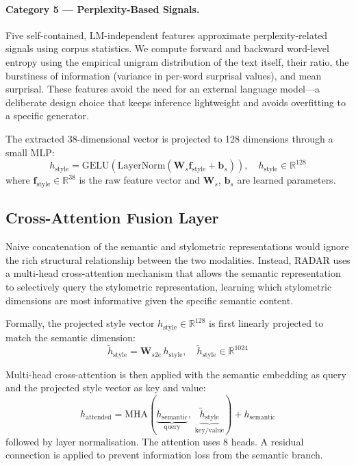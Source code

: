 \paragraph{Category 5 — Perplexity-Based Signals.} Five self-contained, LM-independent
features approximate perplexity-related signals using corpus statistics. We compute forward and
backward word-level entropy using the empirical unigram distribution of the text itself, their
ratio, the burstiness of information (variance in per-word surprisal values), and mean surprisal.
These features avoid the need for an external language model—a deliberate design choice that keeps
inference lightweight and avoids overfitting to a specific generator.

The extracted 38-dimensional vector is projected to 128 dimensions through a small MLP:
\begin{equation}
  h_\text{style} = \mathrm{GELU}(\mathrm{LayerNorm}(\mathbf{W}_s \mathbf{f}_\text{style} + \mathbf{b}_s)),
  \quad h_\text{style} \in \mathbb{R}^{128}
\end{equation}
where $\mathbf{f}_\text{style} \in \mathbb{R}^{38}$ is the raw feature vector and $\mathbf{W}_s$,
$\mathbf{b}_s$ are learned parameters.

\subsection{Cross-Attention Fusion Layer}

Naive concatenation of the semantic and stylometric representations would ignore the rich structural
relationship between the two modalities. Instead, RADAR uses a multi-head cross-attention mechanism
that allows the semantic representation to selectively query the stylometric representation,
learning which stylometric dimensions are most informative given the specific semantic content.

Formally, the projected style vector $h_\text{style} \in \mathbb{R}^{128}$ is first
linearly projected to match the semantic dimension:
\begin{equation}
  \tilde{h}_\text{style} = \mathbf{W}_{s2e}\, h_\text{style}, \quad \tilde{h}_\text{style} \in \mathbb{R}^{1024}
\end{equation}

Multi-head cross-attention is then applied with the semantic embedding as query and the
projected style vector as key and value:
\begin{equation}
  h_\text{attended} = \mathrm{MHA}\!\left(\underbrace{h_\text{semantic}}_{\text{query}},\;
  \underbrace{\tilde{h}_\text{style}}_{\text{key/value}}\right) + h_\text{semantic}
\end{equation}
followed by layer normalisation. The attention uses 8 heads. A residual connection is
applied to prevent information loss from the semantic branch.


